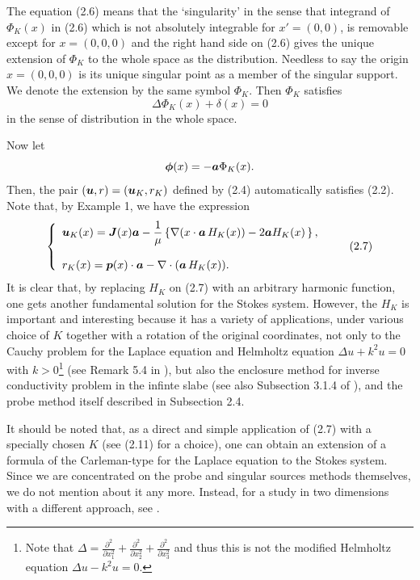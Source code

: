 The equation (2.6)  means that the `singularity' in the sense that integrand of $\Phi_K(x)$ in (2.6)
which is not absolutely integrable for $x'=(0,0)$, is removable
except for $x=(0,0,0)$
and the right hand side on (2.6) gives the unique extension of $\Phi_K$ to the whole space as the distribution.
Needless to say the origin $x=(0,0,0)$ is its unique singular point as a member of the singular support.
We denote the extension by the same symbol
$\Phi_K$.  Then $\Phi_K$ satisfies
$$\displaystyle
\Delta\Phi_K(x)+\delta(x)=0
$$
in the sense of distribution in the whole space.

Now let
$$\displaystyle
\mbox{\boldmath $\phi$}(x)=-\mbox{\boldmath $a$}\Phi_K(x).
$$
Then, the pair
$(\mbox{\boldmath $u$}, r)=(\mbox{\boldmath $u$}_K,
r_K)$ defined by (2.4) automatically satisfies (2.2).
Note that, by Example 1, we have the expression
$$\left\{
\begin{array}{l}
\displaystyle
\mbox{\boldmath $u$}_K(x)=\mbox{\boldmath $J$}(x)\mbox{\boldmath $a$}
-\frac{1}{\mu}
\left\{\nabla(x\cdot\mbox{\boldmath $a$}\,H_K(x))-2\mbox{\boldmath $a$}H_K(x)\,\right\},
\\
\\
\displaystyle
r_K(x)=\mbox{\boldmath $p$}(x)\cdot\mbox{\boldmath $a$}-
\nabla\cdot(\mbox{\boldmath $a$}\,H_K(x)).
\end{array}
\right.
\tag {2.7}
$$
It is clear that, by replacing $H_K$ on (2.7) with an arbitrary harmonic function, one gets another fundamental solution for the Stokes system.
However, the $H_K$ is important and interesting because it has a variety of applications, under various choice of $K$
together with a rotation of the original coordinates,
not only to the Cauchy problem for the Laplace equation \cite{Y4} and Helmholtz equation 
$\Delta u+k^2 u=0$ with $k>0$\footnote{Note that $\Delta=\frac{\partial^2}{\partial x_1^2}
+\frac{\partial^2}{\partial x_2^2}+\frac{\partial^2}{\partial x_3^2}$ and thus
this is not the modified Helmholtz equation
$\Delta u-k^2u=0$.}
(see Remark 5.4 in \cite{IProbeCarleman}), but also the enclosure method for
inverse conductivity problem in the infinte slabe \cite{Islab} (see also Subsection 3.1.4 of \cite{IReview}),
and the probe method itself \cite{IProbeCarleman} described in Subsection 2.4.

It should be noted that, as a direct and simple application of (2.7) with a specially chosen $K$
(see (2.11) for a choice), one can obtain an extension of a formula of the Carleman-type for the Laplace equation \cite{Y4} to the Stokes system.
Since we are concentrated on the probe and singular sources methods themselves, we do not mention about it any more.
Instead, for a study in two dimensions with a different approach, see \cite{Ar}.








